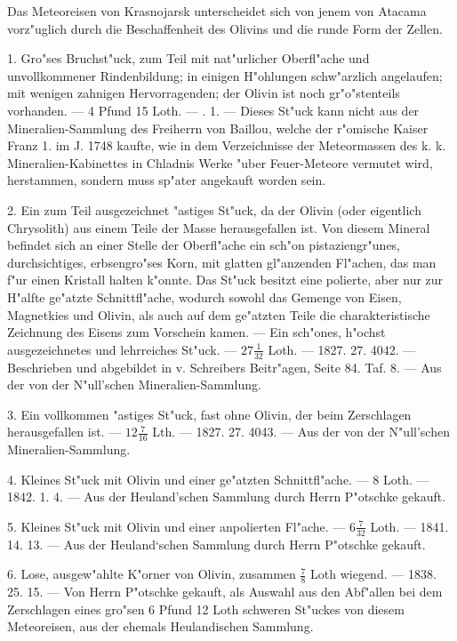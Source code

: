 \documentclass[a4paper, 11pt, oneside, polutonikogreek, german]{article}
\begin{document}
Das Meteoreisen von Krasnojarsk unterscheidet sich von jenem von Atacama vorz"uglich durch die Beschaffenheit des Olivins und die runde Form der Zellen.

1. Gro"ses Bruchst"uck, zum Teil mit nat"urlicher Oberfl"ache und unvollkommener Rindenbildung; in einigen H"ohlungen schw"arzlich angelaufen; mit wenigen zahnigen Hervorragenden; der Olivin ist noch gr"o"stenteils vorhanden. --- 4 Pfund 15 Loth. --- . 1. --- Dieses St"uck kann nicht aus der Mineralien-Sammlung des Freiherrn von Baillou, welche der r"omische Kaiser Franz 1. im J. 1748 kaufte, wie in dem Verzeichnisse der Meteormassen des k. k. Mineralien-Kabinettes in Chladnis Werke "uber Feuer-Meteore vermutet wird, herstammen, sondern muss sp"ater angekauft worden sein.

2. Ein zum Teil ausgezeichnet "astiges St"uck, da der Olivin (oder eigentlich Chrysolith) aus einem Teile der Masse herausgefallen ist. Von diesem Mineral befindet sich an einer Stelle der Oberfl"ache ein sch"on pistaziengr"unes, durchsichtiges, erbsengro"ses Korn, mit glatten gl"anzenden Fl"achen, das man f"ur einen Kristall halten k"onnte. Das St"uck besitzt eine polierte, aber nur zur H"alfte ge"atzte Schnittfl"ache, wodurch sowohl das Gemenge von Eisen, Magnetkies und Olivin, als auch auf dem ge"atzten Teile die charakteristische Zeichnung des Eisens zum Vorschein kamen. --- Ein sch"ones, h"ochst ausgezeichnetes und lehrreiches St"uck. --- $\mathfrak{27\frac{1}{32}}$ Loth. --- 1827. 27. 4042. --- Beschrieben und abgebildet in v. Schreibers Beitr"agen, Seite 84. Taf. 8. --- Aus der von der N"ull'schen Mineralien-Sammlung.

3. Ein vollkommen "astiges St"uck, fast ohne Olivin, der beim Zerschlagen herausgefallen ist. --- $\mathfrak{12\frac{7}{16}}$ Lth. --- 1827. 27. 4043. --- Aus der von der N"ull'schen Mineralien-Sammlung.

4. Kleines St"uck mit Olivin und einer ge"atzten Schnittfl"ache. --- 8 Loth. --- 1842. 1. 4. --- Aus der Heuland'schen Sammlung durch Herrn P"otschke gekauft.

5. Kleines St"uck mit Olivin und einer anpolierten Fl"ache. --- $\mathfrak{6\frac{7}{32}}$ Loth. --- 1841. 14. 13. --- Aus der Heuland‘schen Sammlung durch Herrn P"otschke gekauft.

6. Lose, ausgew"ahlte K"orner von Olivin, zusammen $\mathfrak{\frac{7}{8}}$ Loth wiegend. --- 1838. 25. 15. --- Von Herrn P"otschke gekauft, als Auswahl aus den Abf"allen bei dem Zerschlagen eines gro"sen 6 Pfund 12 Loth schweren St"uckes von diesem Meteoreisen, aus der ehemals Heulandischen Sammlung.
\end{document}
